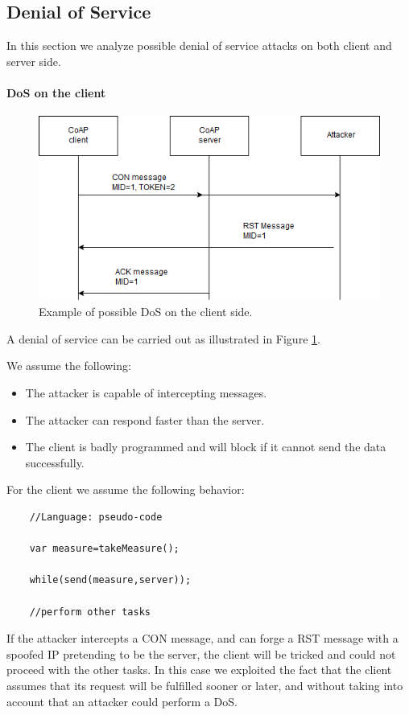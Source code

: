 	\subsection{Denial of Service}
	In this section we analyze possible denial of service attacks on both client and server side.
	
	\paragraph{DoS on the client}
	\begin{figure}
		\includegraphics[width=\linewidth]{coap-vuln-img0.png}
		\caption{Example of possible DoS on the client side.}
		\label{fig:coap-vuln0}
	\end{figure}
	A denial of service can be carried out as illustrated in Figure \ref{fig:coap-vuln0}.\newline
	
	We assume the following:
	\begin{itemize}
		\item The attacker is capable of intercepting messages.
		\item The attacker can respond faster than the server.
		\item The client is badly programmed and will block if it cannot send the data successfully.
	\end{itemize}

	For the client we assume the following behavior:
	\begin{lstlisting}
	//Language: pseudo-code
	
	var measure=takeMeasure();
	
	while(send(measure,server));
	
	//perform other tasks
	\end{lstlisting}
	
	If the attacker intercepts a CON message, and can forge a RST message with a spoofed IP pretending to be the server, the client will be tricked and could not proceed with the other tasks.\newline
	In this case we exploited the fact that the client assumes that its request will be fulfilled sooner or later, and
	without taking into account that an attacker could perform a DoS.\newline
	

